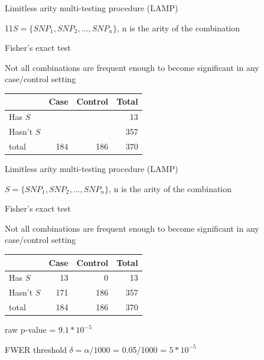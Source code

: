 \documentclass[ignorenonframetext,]{beamer}
\begin{document}
\begin{frame}{Limitless arity multi-testing procedure (LAMP)}

11\(S=\{SNP_1, SNP_2,...,SNP_n\}\), n is the arity of the combination

\pause

\begin{block}{Fisher's exact test}

Not all combinations are frequent enough to become significant in any
case/control setting

\pause

\begin{longtable}[]{@{}lrrr@{}}
\toprule
& Case & Control & Total\tabularnewline
\midrule
\endhead
Has \(S\) & & & 13\tabularnewline
Hasn't \(S\) & & & 357\tabularnewline
total & 184 & 186 & 370\tabularnewline
\bottomrule
\end{longtable}

\end{block}

\end{frame}

\begin{frame}{Limitless arity multi-testing procedure (LAMP)}

\(S=\{SNP_1, SNP_2,...,SNP_n\}\), n is the arity of the combination

\begin{block}{Fisher's exact test}

Not all combinations are frequent enough to become significant in any
case/control setting

\begin{longtable}[]{@{}lrrr@{}}
\toprule
& Case & Control & Total\tabularnewline
\midrule
\endhead
Has \(S\) & 13 & 0 & 13\tabularnewline
Hasn't \(S\) & 171 & 186 & 357\tabularnewline
total & 184 & 186 & 370\tabularnewline
\bottomrule
\end{longtable}

\pause

raw p-value = \(9.1*10^{-5}\)

\pause

FWER threshold \(\delta=\alpha/1000\) = 0.05/1000 = \(5*10^{-5}\)

\end{block}

\end{frame}
\end{document}
